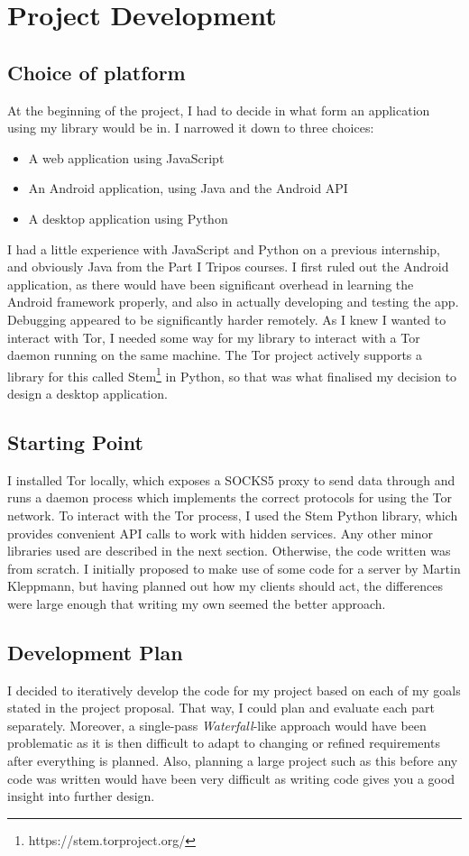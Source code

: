 \documentclass[diss.tex]{subfiles}
\begin{document}
\section{Project Development}

\subsection{Choice of platform}
At the beginning of the project, I had to decide in what form an application using my library would be in. I narrowed it down to three choices:
\begin{itemize}
\item A web application using JavaScript
\item An Android application, using Java and the Android API
\item A desktop application using Python
\end{itemize}

I had a little experience with JavaScript and Python on a previous internship, and obviously Java from the Part I Tripos courses. I first ruled out the Android application, as there would have been significant overhead in learning the Android framework properly, and also in actually developing and testing the app. Debugging appeared to be significantly harder remotely. As I knew I wanted to interact with Tor, I needed some way for my library to interact with a Tor daemon running on the same machine. The Tor project actively supports a library for this called Stem\footnote{https://stem.torproject.org/} in Python, so that was what finalised my decision to design a desktop application.

\subsection{Starting Point}
I installed Tor locally, which exposes a SOCKS5 proxy to send data through and runs a daemon process which implements the correct protocols for using the Tor network. To interact with the Tor process, I used the Stem Python library, which provides convenient API calls to work with hidden services. Any other minor libraries used are described in the next section. Otherwise, the code written was from scratch. I initially proposed to make use of some code for a server by Martin Kleppmann, but having planned out how my clients should act, the differences were large enough that writing my own seemed the better approach.

\subsection{Development Plan}
I decided to iteratively develop the code for my project based on each of my goals stated in the project proposal. That way, I could plan and evaluate each part separately. Moreover, a single-pass \textit{Waterfall}-like approach would have been problematic as it is then difficult to adapt to changing or refined requirements after everything is planned. Also, planning a large project such as this before any code was written would have been very difficult as writing code gives you a good insight into further design.
\end{document}
